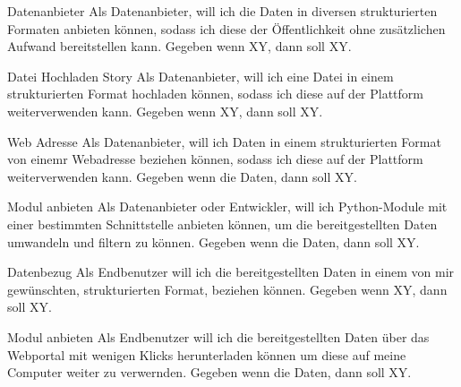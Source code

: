 \begin{scrumepic}[label=epic:datenanbieter]{Datenanbieter}
	Als Datenanbieter, will ich die Daten in diversen strukturierten Formaten anbieten können, sodass ich diese der Öffentlichkeit ohne zusätzlichen Aufwand bereitstellen kann.
	\storyacceptance	
	Gegeben
	wenn XY, dann soll XY.
\end{scrumepic}

\begin{scrumstory}[label=story:dateihochladen]{Datei Hochladen Story}
	Als Datenanbieter, will ich eine Datei in einem strukturierten Format hochladen können, sodass ich diese auf der Plattform weiterverwenden kann.
	\storyacceptance	
	Gegeben
	wenn XY, dann soll XY.
\end{scrumstory}

\begin{scrumstory}[label=story:pfadangeben]{Web Adresse}
	Als Datenanbieter, will ich Daten in einem strukturierten Format von einemr Webadresse beziehen können, sodass ich diese auf der Plattform weiterverwenden kann.
	\storyacceptance	
	Gegeben
	wenn die Daten, dann soll XY.
\end{scrumstory}
\begin{scrumstory}[label=story:modulanbieten]{Modul anbieten}
	Als Datenanbieter oder Entwickler, will ich Python-Module mit einer bestimmten Schnittstelle anbieten können, um die bereitgestellten Daten umwandeln und filtern zu können.
	\storyacceptance	
	Gegeben
	wenn die Daten, dann soll XY.
\end{scrumstory}

\begin{scrumepic}[label=epic:datenbezug]{Datenbezug}
	Als Endbenutzer will ich die bereitgestellten Daten in einem von mir gewünschten, strukturierten Format, beziehen können.
	\storyacceptance	
	Gegeben
	wenn XY, dann soll XY.
\end{scrumepic}
\begin{scrumstory}[label=story:modulanbieten]{Modul anbieten}
	Als Endbenutzer will ich die bereitgestellten Daten über das Webportal mit wenigen Klicks herunterladen können um diese auf meine Computer weiter zu verwernden.
	\storyacceptance	
	Gegeben
	wenn die Daten, dann soll XY.
\end{scrumstory}

